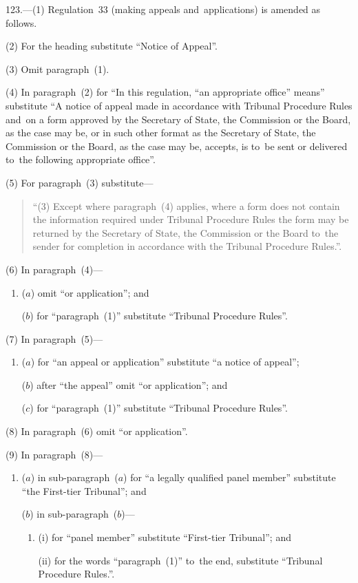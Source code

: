 \documentclass[12pt,a4paper]{article}
\begin{document}
\medskip

123.---(1)  Regulation~33 (making appeals and~applications) is amended as follows.

(2) For the heading substitute “Notice of Appeal”.

(3) Omit paragraph~(1).

(4) In paragraph~(2) for “In this regulation, “an appropriate office” means” substitute “A notice of appeal made in accordance with Tribunal Procedure Rules and~on a form approved by the Secretary of State, the Commission or the Board, as the case may be, or in such other format as the Secretary of State, the Commission or the Board, as the case may be, accepts, is to~be sent or delivered to~the following appropriate office”.

(5) For paragraph~(3) substitute—
\begin{quotation}
“(3) Except where paragraph~(4) applies, where a form does not contain the information required under Tribunal Procedure Rules the form may be returned by the Secretary of State, the Commission or the Board to~the sender for completion in accordance with the Tribunal Procedure Rules.”.
\end{quotation}

(6) In paragraph~(4)—
\begin{enumerate}\item[]
($a$) omit “or application”; and

($b$) for “paragraph~(1)” substitute “Tribunal Procedure Rules”.
\end{enumerate}

\enlargethispage{-3\baselineskip}

(7) In paragraph~(5)—
\begin{enumerate}\item[]
($a$) for “an appeal or application” substitute “a notice of appeal”;

($b$) after “the appeal” omit “or application”; and

($c$) for “paragraph~(1)” substitute “Tribunal Procedure Rules”.
\end{enumerate}

(8) In paragraph~(6) omit “or application”.

(9) In paragraph~(8)—
\begin{enumerate}\item[]
($a$) in sub-paragraph~($a$)  for “a legally qualified panel member” substitute “the First-tier Tribunal”; and

($b$) in sub-paragraph~($b$)—
\begin{enumerate}\item[]
(i) for “panel member” substitute “First-tier Tribunal”; and

(ii) for the words “paragraph~(1)” to~the end, substitute “Tribunal Procedure Rules.”.
\end{enumerate}
\end{enumerate}
\end{document}
